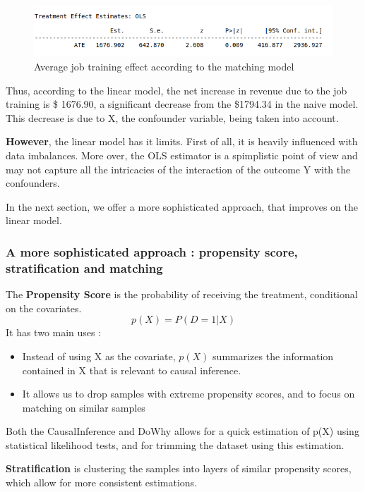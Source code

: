 \documentclass{article}
\begin{document}
\begin{figure}[h]
\small
\centering
\includegraphics[width=0.8 \textwidth]{../figures/ate_linear_model.png}
\caption{Average job training effect according to the matching model}
\end{figure}



Thus, according to the linear model, the net increase in revenue due to the job training is \$ 1676.90, a significant decrease from the \$1794.34 in the naive model. This decrease is due to X, the confounder variable, being taken into account.

\textbf{However}, the linear model has it limits. First of all, it is heavily influenced with data imbalances. More over, the OLS estimator is a spimplistic point of view and may not capture all the intricacies of the interaction of the outcome Y with the confounders.

In the next section, we offer a more sophisticated approach, that improves on the linear model.

\subsubsection{A more sophisticated approach : propensity score, stratification and matching}

The \textbf{Propensity Score} is the probability of receiving the treatment, conditional on the covariates.
$$ p(X) = P( D=1 \vert X )$$
It has two main uses : 
\begin{itemize}
    \item Instead of using X as the covariate, $p(X)$ summarizes the information contained in X that is relevant to causal inference.
    \item It allows us to drop samples with extreme propensity scores, and to focus on matching on similar samples
\end{itemize}
Both the CausalInference and DoWhy allows for a quick estimation of p(X) using statistical likelihood tests, and for trimming the dataset using this estimation.

\textbf{Stratification} is clustering the samples into layers of similar propensity scores, which allow for more consistent estimations.
\end{document}
